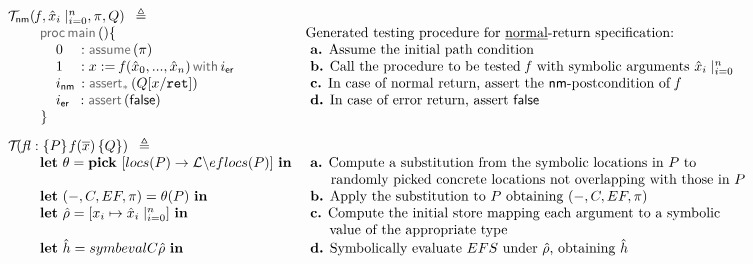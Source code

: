 \begin{figure}
{\scriptsize
$$
\begin{array}{ll}
\testify{\fnormal}(\pid, \svar_i\mid_{i=0}^n, \pc, Q) \ \semeq & \\
         \dspc \dspc  \darkmath{\sf proc} \jsilmain () \{ 
         &  \text{Generated testing procedure for \underline{normal}-return specification:} \\ 
             \dspc \dspc \dspc 0_{\phantom{\sf nm}}:  \assume(\pc) 
                   & \text{  {\bf a.} Assume the initial path condition} \\ 
             \dspc \dspc \dspc 1_{\phantom{\sf nm}}: \jsilcall{\jvar}{\pid}{\svar_0, ..., \svar_n}{\errlab}  
                   & \text{  {\bf b.} Call the procedure to be tested $\pid$ with symbolic arguments $\svar_i\mid_{i=0}^n$} \\ 
             \dspc \dspc \dspc \retlab \, : \sepassert(Q[\jvar/\retvar])
                  & \text{  {\bf c.}  In case of normal return, assert the $\fnormal$-postcondition of $\pid$} \\ 
             \dspc \dspc \dspc \errlab \, \, \, : \jassert(\jfalse)
                  & \text{  {\bf d.}  In case of error return, assert $\jfalse$} \\ 
         \ \ \ \ \ \ \ \} &\\[8pt]
\testify{}(\specsig{P}{\pid(\jvec{x})}{Q}{\flag}) \ \semeq & \\      
    \dspc \dspc  \mathbf{let} \ \subst = \mathbf{pick} \ \functionset{locs(P)}{\locs \backslash eflocs(P)} \ \mathbf{in} 
           & \text{  {\bf a.}  Compute a substitution from the symbolic locations in $P$ to} \\ 
           & \text{ $\phantom{a.}\ $ randomly picked concrete locations not overlapping with those in $P$}  \\
    \dspc \dspc  \mathbf{let} \ (-, C, EF, \pc) = \subst(P) \ \mathbf{in}  
            & \text{  {\bf b.}  Apply the substitution to $P$ obtaining $(-, C, EF, \pc)$}  \\
    \dspc \dspc  \mathbf{let} \ \sstore = [ \jvar_i \mapsto \svar_i \mid_{i=0}^n] \ \mathbf{in} 
            & \text{  {\bf c.} Compute the initial store mapping each argument to a symbolic}  \\
            & \text{ $\phantom{c.} \ $  value of the appropriate type}  \\
    \dspc \dspc  \mathbf{let} \ \sheap = symbeval{C}{\sstore} \ \mathbf{in} 
           & \text{  {\bf d.}  Symbolically evaluate $EFS$ under $\sstore$, obtaining $\sheap$}  \\

\end{array}$$}
\end{figure}
